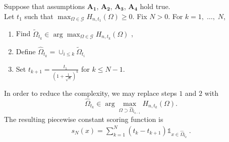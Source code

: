 \begin{algorithm} \label{aistat:algo1} Suppose that assumptions $\mathbf{A_1}$, $\mathbf{A_2}$, $\mathbf{A_3}$, $\mathbf{A_4}$ hold true.\\ Let $t_1$ such that $\max_{\Omega \in \mathcal{G}}H_{n,t_1}(\Omega)
\ge  0$. 
Fix  $N>0$. %
For $k=1,\; \ldots,\; N$, 
\begin{enumerate} 
\item   Find  $\tilde{\Omega}_{t_k} \in \arg\max_{\Omega \in \mathcal{G}}
H_{n,t_k}(\Omega)$ , %
\item  Define $\hat \Omega_{t_k}= \cup_{i \le k} \tilde \Omega_{t_i}$
\item  Set  $ t_{k+1} =\frac{t_1}{(1+\frac{1}{\sqrt n})^{k}}   $ for $k\le N-1$. %
\end{enumerate} 

In order to reduce the complexity, we may replace steps $1$ and $2$
with $$\hat {\Omega}_{t_k} \in \arg\max_{\Omega \supset \hat \Omega_{t_{k-1}}} H_{n,t_k}(\Omega).$$
\noindent
The resulting piecewise constant scoring function is
\begin{align}
\label{aistat:definition_sN}
s_N(x)= \sum_{k=1}^{N}(t_{k}-t_{k+1}) \mathds{1}_{x \in \hat{\Omega}_{t_k}}~.
\end{align}
\end{algorithm}




